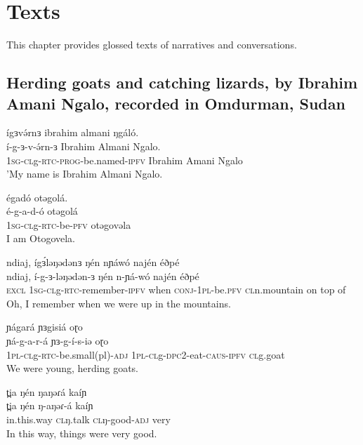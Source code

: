 \chapter{Texts}

This chapter provides glossed texts of narratives and conversations.  

\section{Herding goats and catching lizards, by Ibrahim Amani Ngalo, recorded in Omdurman, Sudan}

\ea  	ígɜvə́rnɜ ibrahim almani ŋgáló.\\ %
		\gll  í-g-ɜ-v-ə́rn-ɜ Ibrahim Almani Ngalo.\\	
		  \textsc{1sg-cl}g-\textsc{rtc}-\textsc{prog}-be.named-\textsc{ipfv} Ibrahim Amani Ngalo \\
		 \glt 'My name is Ibrahim Almani Ngalo. 

\ex  	égadó otəgolá.	 \\	 %
		\gll é-g-a-d-ó otəgolá\\	
		 \textsc{1sg-cl}g-\textsc{rtc}-be-\textsc{pfv}  otəgovəla\\
		\glt I am Otogovela.

\ex  	ndiaj, ígɜ́ləŋədənɜ ŋén nɲáwó najén éðpé	 \\	
		\gll ndiaj, í-g-ɜ-ləŋədən-ɜ ŋén n-ɲá-wó najén éðpé \\	
		\textsc{excl} \textsc{1sg-cl}g-\textsc{rtc}-remember-\textsc{ipfv} when \textsc{conj-1pl}-be.\textsc{pfv} \textsc{cl}n.mountain on top of\\
		\glt Oh, I remember when we were up in the mountains.

\ex  	ɲágará ɲɜgisiá oɽo	 \\	%
		\gll ɲá-g-a-r-á ɲɜ-g-í-s-iə oɽo \\	
		\textsc{1pl-cl}g-\textsc{rtc}-be.small(pl)-\textsc{adj} \textsc{1pl-cl}g-\textsc{dpc2}-eat-\textsc{caus-ipfv} \textsc{cl}g.goat\\
		\glt We were young, herding goats.

\ex  	t̪ia ŋén ŋaŋəɾá kaíɲ	 \\	
		\gll t̪ia ŋén ŋ-aŋəɾ-á kaíɲ \\	
		in.this.way \textsc{cl}ŋ.talk \textsc{cl}ŋ-good-\textsc{adj} very\\
		\glt In this way, things were very good. 

